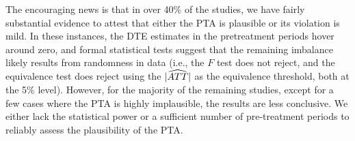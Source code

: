 \documentclass[12pt]{article}
\begin{document}
The encouraging news is that in over 40\% of the studies, we have fairly substantial evidence to attest that either the PTA is plausible or its violation is mild. In these instances, the DTE estimates in the pretreatment periods hover around zero, and formal statistical tests suggest that the remaining imbalance likely results from randomness in data (i.e., the $F$ test does not reject, and the equivalence test does reject using the $|\widehat{ATT}|$ as the equivalence threshold, both at the 5\% level). However, for the majority of the remaining studies, except for a few cases where the PTA is highly implausible, the results are less conclusive. We either lack the statistical power or a sufficient number of pre-treatment periods to reliably assess the plausibility of the PTA.


\FloatBarrier
\end{document}
